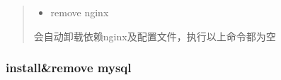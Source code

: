 \documentclass[a4paper,10pt,english]{sphinxmanual}
\begin{document}
\begin{quote}
\begin{itemize}
\item {} 
remove nginx

\begin{sphinxVerbatim}[commandchars=\\\{\}]
     
\end{sphinxVerbatim}

\end{itemize}

会自动卸载依赖nginx及配置文件，执行以上命令都为空
\end{quote}


\subsubsection{install\&remove mysql}
\end{document}
